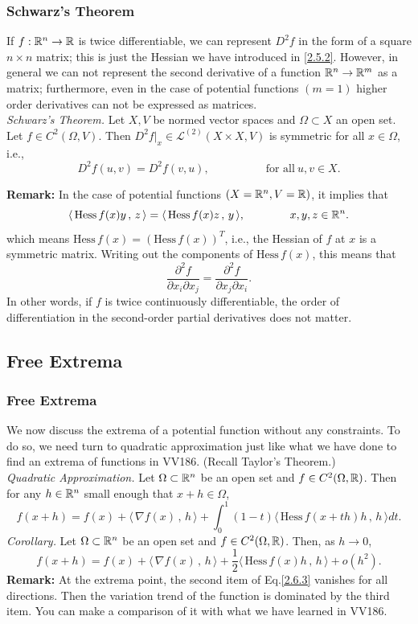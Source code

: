 \documentclass[10pt, t, allowdisplaybreaks]{beamer}
\renewcommand{\emph}[1]{{\color{Turquoise3}\textsl{#1}}}
\newcommand{\nullspace}{~\\[15pt]}
\newcommand{\scp}[2]{\langle\,#1\,,\,#2\,\rangle} \newcommand{\scpp}{\langle\,\cdot\,,\,\cdot\,\rangle}
\begin{document}
\begin{frame}
    \frametitle{Schwarz's Theorem}

    If $f:\mathbb{R}^n\to\mathbb{R}$ is twice dif{}ferentiable, we can represent $D^2f$ in the form of a square $n\times n$ matrix; this is just the Hessian we have introduced in \eqref{2.5.2}.
    However, in general we can not represent the second derivative of a
    function $\mathbb{R}^n\to\mathbb{R}^m$ as a matrix; furthermore, even in the case of potential functions $(m=1)$ higher order derivatives can not be expressed as matrices.\\[6pt]
    \emph{Schwarz's Theorem.} Let $X,V$ be normed vector spaces and $\Omega\subset X$ an open set. Let $f\in C^2(\Omega,V)$. Then $D^2f|_x\in\mathcal{L}^{(2)}(X\times X,V)$ is symmetric for all $x\in\Omega$, i.e.,
    \[D^2f(u,v)=D^2f(v,u),\qquad\qquad\quad
        \text{for all}~u,v\in X.\]

    \textbf{Remark:} In the case of potential functions $(X=\mathbb{R}^n,V=\mathbb{R})$, it implies that
    \[\scp{\text{Hess}\,f(x)y}{z}=\scp{\text{Hess}\,f(x)z}{y},
        \qquad\qquad x,y,z\in\R^n.\]
    which means $\text{Hess}\,f(x)=(\text{Hess}\,f(x))^T$, i.e., the Hessian of $f$ at $x$ is a symmetric matrix. Writing out the components of $\text{Hess}\,f(x)$, this means that
    \[\frac{\partial^2f}{\partial x_i\partial x_j}=\frac{\partial^2f}{\partial x_j\partial x_i}.\]
    In other words, if $f$ is twice continuously dif{}ferentiable, the order of
    dif{}ferentiation in the second-order partial derivatives does not matter.
\end{frame}

\subsection{Free Extrema}
\begin{frame}
    \frametitle{Free Extrema}
    We now discuss the extrema of a potential function without any constraints. To do so, we need turn to quadratic approximation just like what we have done to find an extrema of functions in VV186. (Recall Taylor's Theorem.)
    \nullspace
    \emph{Quadratic Approximation.} Let $\Omega\subset\mathbb{R}^n$ be an open set and $f\in C^2(\Omega,\mathbb{R})$. Then for any $h\in\mathbb{R}^n$ small enough that $x+h\in\Omega$,
    \begin{equation}\label{2.6.2}
        f(x+h)=f(x)+\scp{\nabla f(x)}{h}+\int_{0}^{1}(1-t)\scp{\text{Hess}\,f(x+th)h}{h}dt.
    \end{equation}
    \emph{Corollary.} Let $\Omega\subset\mathbb{R}^n$ be an open set and $f\in C^2(\Omega,\mathbb{R})$. Then, as $h\to0$,
    \begin{equation}\label{2.6.3}
        f(x+h)=f(x)+\scp{\nabla f(x)}{h}+\frac{1}{2}\scp{\text{Hess}\,f(x)h}{h}+o(h^2).
    \end{equation}
    \textbf{Remark:} At the extrema point, the second item of Eq.\ref{2.6.3} vanishes for all directions. Then the variation trend of the function is dominated by the third item. You can make a comparison of it with what we have learned in VV186.
\end{frame}
\end{document}
